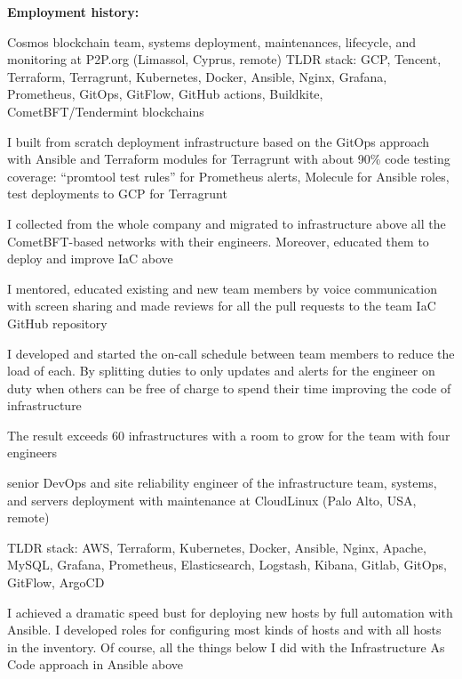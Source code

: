 {\begin{list}{●}
    \item \textbf{Employment history:} {}
          \HistoryHead
    \item {}%
          Cosmos blockchain team, systems deployment, maintenances, lifecycle, and monitoring at P2P.org (Limassol, Cyprus, remote)
          \PositonHead
          TLDR stack: GCP, Tencent, Terraform, Terragrunt, Kubernetes, Docker, Ansible, Nginx, Grafana, Prometheus, GitOps, GitFlow, GitHub actions, Buildkite, CometBFT/Tendermint blockchains
    \item I built from scratch deployment infrastructure based on the GitOps approach with Ansible and Terraform modules for Terragrunt with about 90\% code testing coverage: “promtool test rules” for Prometheus alerts, Molecule for Ansible roles, test deployments to GCP for Terragrunt
    \item I collected from the whole company and migrated to infrastructure above all the CometBFT-based networks with their engineers. Moreover, educated them to deploy and improve IaC above
    \item I mentored, educated existing and new team members by voice communication with screen sharing and made reviews for all the pull requests to the team IaC GitHub repository
    \item I developed and started the on-call schedule between team members to reduce the load of each. By splitting duties to only updates and alerts for the engineer on duty when others can be free of charge to spend their time improving the code of infrastructure
    \item The result exceeds 60 infrastructures with a room to grow for the team with four engineers
  \end{list}
  \item {}senior DevOps and site reliability engineer of the infrastructure team, systems, and servers deployment with maintenance at CloudLinux (Palo Alto, USA, remote)
  \PositonHead
  \item TLDR stack: AWS, Terraform, Kubernetes, Docker, Ansible, Nginx, Apache, MySQL, Grafana, Prometheus, Elasticsearch, Logstash, Kibana, Gitlab, GitOps, GitFlow, ArgoCD
  \item I achieved a dramatic speed bust for deploying new hosts by full automation with Ansible. I developed roles for configuring most kinds of hosts and with all hosts in the inventory. Of course, all the things below I did with the Infrastructure As Code approach in Ansible above
}

